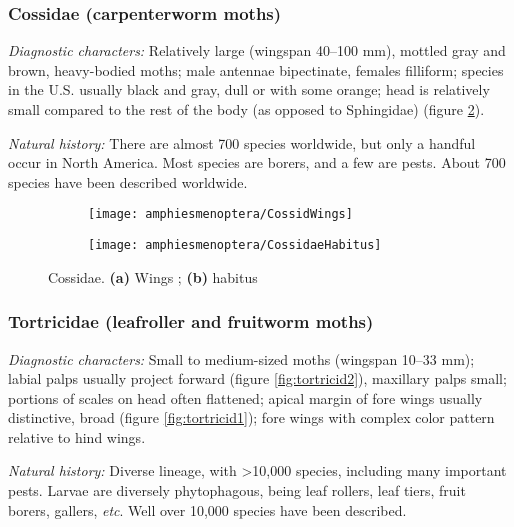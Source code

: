 \subsubsection{Cossidae (carpenterworm moths)}
\noindent{}\textit{Diagnostic characters:} Relatively large (wingspan 40--100 mm), mottled gray and brown, heavy-bodied moths; male antennae bipectinate, females filliform; species in the U.S. usually black and gray, dull or with some orange; head is relatively small compared to the rest of the body (as opposed to Sphingidae) (figure \ref{fig:cossid2}).\vspace{3mm}

\noindent{}\textit{Natural history:} There are almost 700 species worldwide, but only a handful occur in North America. Most species are borers, and a few are pests. About 700 species have been described worldwide.\vspace{3mm}

\begin{figure}[ht!]
    \centering
    \begin{subfigure}[ht!]{0.35\textwidth}
        \texttt{[image: amphiesmenoptera/CossidWings]}
        \caption{}
        \label{fig:cossid1}
    \end{subfigure}
    \hfill 
    \begin{subfigure}[ht!]{0.6\textwidth}
        \texttt{[image: amphiesmenoptera/CossidaeHabitus]}
        \caption{}
        \label{fig:cossid2}
    \end{subfigure}
    \caption{Cossidae. \textbf{(a)} Wings \citep[Fig. 343]{comstock1918wings}; \textbf{(b)} habitus \citep[modified from][plate 97, fig. b]{bhlitem38567}}\label{fig:cossids}
\end{figure}

\subsubsection{Tortricidae (leafroller and fruitworm moths)}
\noindent{}\textit{Diagnostic characters:} Small to medium-sized moths (wingspan 10--33 mm); labial palps usually project forward (figure \ref{fig:tortricid2}), maxillary palps small; portions of scales on head often flattened; apical margin of fore wings usually distinctive, broad (figure \ref{fig:tortricid1}); fore wings with complex color pattern relative to hind wings.\vspace{3mm}

\noindent{}\textit{Natural history:} Diverse lineage, with \textgreater10,000 species, including many important pests. Larvae are diversely phytophagous, being leaf rollers, leaf tiers, fruit borers, gallers, \textit{etc}. Well over 10,000 species have been described.

